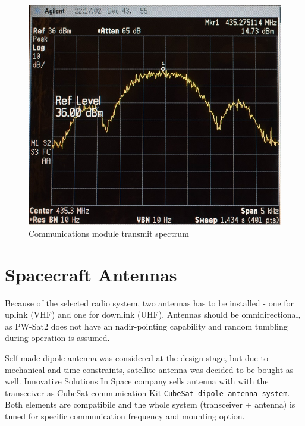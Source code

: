 \begin{figure}[H]
    \centering
    \includegraphics[width=0.6\paperwidth]{img/6/tx_spectrum.jpg}
    \caption{Communications module transmit spectrum}
    \label{tx_spectrum}
\end{figure}









\section{Spacecraft Antennas}
Because of the selected radio system, two antennas has to be installed - one for uplink (VHF) and one for downlink (UHF). Antennas should be omnidirectional, as PW-Sat2 does not have an nadir-pointing capability and random tumbling during operation is assumed.

Self-made dipole antenna was considered at the design stage, but due to mechanical and time constraints, satellite antenna was decided to be bought as well. Innovative Solutions In Space company sells antenna with with the transceiver as CubeSat communication Kit \texttt{CubeSat dipole antenna system}. Both elements are compatibile and the whole system (transceiver + antenna) is tuned for specific communication frequency and mounting option.

